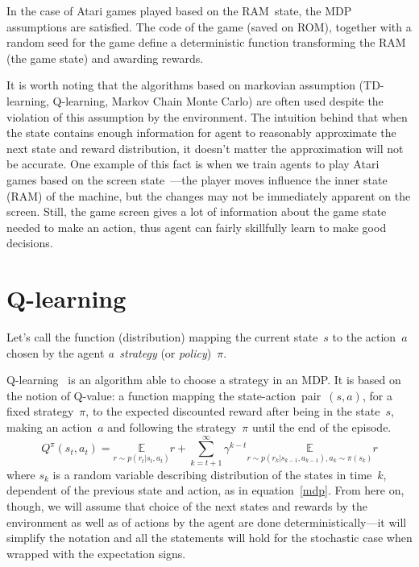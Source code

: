 In the case of Atari games played based on the RAM~state, the MDP assumptions are satisfied. The code of the game (saved on ROM), together with a random seed for the game define a deterministic function transforming the RAM (the game state) and awarding rewards.

It is worth noting that the algorithms based on markovian assumption (TD-learning, Q-learning, Markov Chain Monte Carlo) are often used despite the violation of this assumption by the environment. The intuition behind that when the state contains enough information for agent to reasonably approximate the next state and reward distribution, it doesn't matter the approximation will not be accurate. One example of this fact is when we train agents to play Atari games based on the screen state~\cite{nips-dqn}---the player moves influence the inner state (RAM) of the machine, but the changes may not be immediately apparent on the screen. Still, the game screen gives a lot of information about the game state needed to make an action, thus agent can fairly skillfully learn to make good decisions.

\section{Q-learning}\label{qlearning}
Let's call the function (distribution) mapping the current state~$s$ to the action~$a$ chosen by the agent \emph{a~strategy} (or \emph{policy})~$\pi$.

Q-learning~\cite{qlearning, qlearning-old} is an algorithm able to choose a strategy in an MDP. It is based on the notion of Q-value: a function mapping the state-action~pair~$(s, a)$, for a fixed strategy~$\pi$, to the expected discounted reward after being in the state~$s$, making an action~$a$ and following the strategy~$\pi$ until the end of the episode.
\begin{equation}\label{q-value}
  Q^\pi(s_t, a_t) = \underset{r\sim p(r_t | s_t, a_t)}{\mathbb{E}} r + \sum_{k=t+1}^\infty \gamma^{k-t}\underset{r\sim p(r_k|s_{k-1}, a_{k-1}), a_k\sim \pi(s_k)}{\mathbb{E}} r
\end{equation}
where $s_k$ is a random variable describing distribution of the states in time~$k$, dependent of the previous state and action, as in equation~\eqref{mdp}. From here on, though, we will assume that choice of the next states and rewards by the environment as well as of actions by the agent are done deterministically---it will simplify the notation and all the statements will hold for the stochastic case when wrapped with the expectation signs.

